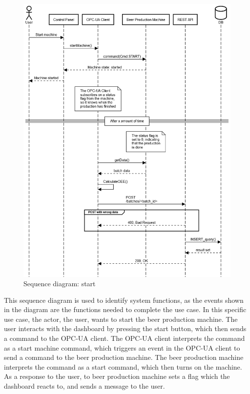 \begin{figure}[H]
\centering 
\includegraphics[width=1\linewidth]{images/sequence_operation/start.png}
\caption{Sequence diagram: start}
\label{figure:sequence_diagram} 
\end{figure}

This sequence diagram is used to identify system functions, as the events shown
in the diagram are the functions needed to complete the use case. In this
specific use case, the actor, the user, wants to start the beer production
machine. The user interacts with the dashboard by pressing the start button,
which then sends a command to the OPC-UA client. The OPC-UA client interprets
the command as a start machine command, which triggers an event in the OPC-UA
client to send a command to the beer production machine. The beer production
machine interprets the command as a start command, which then turns on the 
machine. As a response to the user, to beer production machine sets a flag
which the dashboard reacts to, and sends a message to the user. \\

